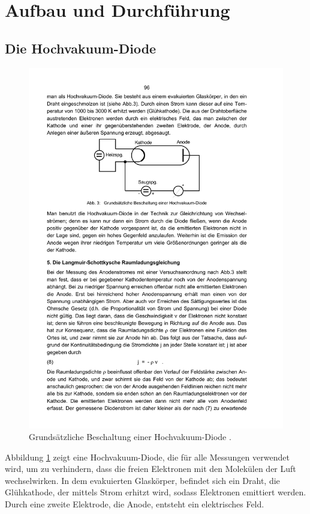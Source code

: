 \section {Aufbau und Durchführung}
\label{sec:durchführung}

\subsection{Die Hochvakuum-Diode}

\begin{figure}
  \centering
  \includegraphics[scale=0.6]{content/diode.pdf}
\caption{Grundsätzliche Beschaltung einer Hochvakuum-Diode \cite{anleitung504}.}
  \label{fig:diode}
\end{figure}

Abbildung \ref{fig:diode} zeigt eine Hochvakuum-Diode, die für alle Messungen verwendet wird, um zu verhindern, dass die freien Elektronen mit den Molekülen der Luft wechselwirken.
In dem evakuierten Glaskörper, befindet sich ein Draht, die Glühkathode, der mittels Strom erhitzt wird, sodass Elektronen emittiert werden. Durch eine zweite Elektrode, die Anode, entsteht ein elektrisches Feld.

